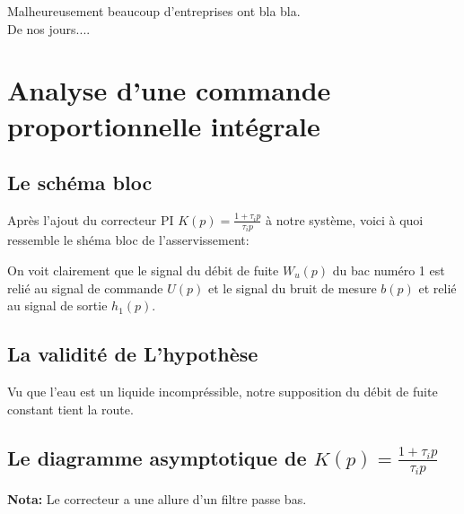 \documentclass[12pt, a4paper, openany]{report}
\begin{document}
   Malheureusement beaucoup d'entreprises ont bla bla. \\
   
   De nos jours....
   

\chapter{Analyse d'une commande proportionnelle intégrale}

 \section{Le schéma bloc} 

	Après l'ajout du correcteur PI $K(p)=\frac {1+\tau_{i}p}{\tau_{i}p}$ à notre système, voici à quoi ressemble le       shéma bloc de l'asservissement:
  \begin{center}
    \label{fig2}
  \end{center}    
 
	On voit clairement que le signal du débit de fuite $W_{u}(p)$ du bac numéro 1 est relié au signal de commande $U(p)$ et le signal du bruit de mesure $b(p)$ et relié au signal de sortie $h_{1}(p)$.    
	
 \section{La validité de L'hypothèse} 
        
	Vu que l'eau est un liquide incompréssible, notre supposition du débit de fuite constant tient la route.
	
 \section{Le diagramme asymptotique de $K(p)=\frac {1+\tau_{i}p}{\tau_{i}p}$} 
 
  \begin{center}
    \label{fig3}
  \end{center}

  \textbf{Nota:} \hspace{2mm} Le correcteur a une allure d'un filtre passe bas.
\end{document}
